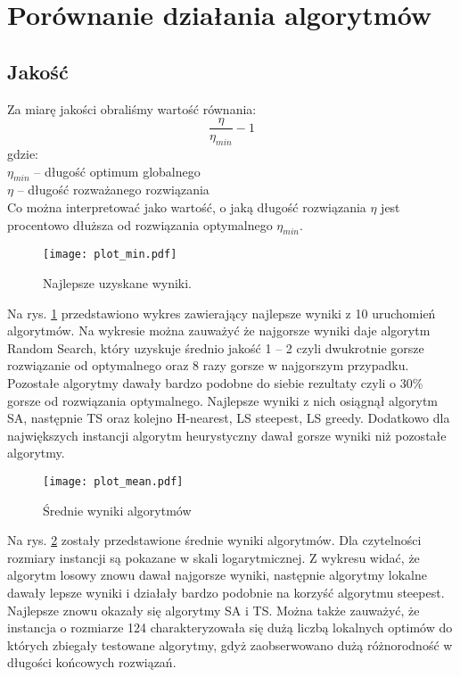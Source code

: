 \documentclass{article}
\begin{document}
\section{Porównanie działania algorytmów}


\subsection{Jakość}
Za miarę jakości obraliśmy wartość równania:
$$ \frac{\eta}{\eta_{min}}-1 $$
gdzie:\\
$\eta_{min}$ -- długość optimum globalnego \\
$\eta$ -- długość rozważanego rozwiązania \\
Co można interpretować jako wartość, o jaką długość rozwiązania $\eta$ jest procentowo dłuższa od rozwiązania optymalnego $\eta_{min}$.

\begin{figure}[H]
\begin{center}
    \texttt{[image: plot\_min.pdf]}
\end{center}
\caption{Najlepsze uzyskane wyniki.}
\label{fig:plot_min}
\end{figure}

Na rys. \ref{fig:plot_min} przedstawiono wykres zawierający najlepsze wyniki z 10 uruchomień algorytmów. Na wykresie można zauważyć że najgorsze wyniki daje algorytm Random Search, który uzyskuje średnio jakość 1 -- 2 czyli dwukrotnie gorsze rozwiązanie od optymalnego oraz 8 razy gorsze w najgorszym przypadku. Pozostałe algorytmy dawały bardzo podobne do siebie rezultaty czyli o 30\% gorsze od rozwiązania optymalnego. Najlepsze wyniki z nich osiągnął algorytm SA, następnie TS oraz kolejno H-nearest, LS steepest, LS greedy. Dodatkowo dla największych instancji algorytm heurystyczny dawał gorsze wyniki niż pozostałe algorytmy.

\begin{figure}[H]
\begin{center}
    \texttt{[image: plot\_mean.pdf]}
\end{center}
\caption{Średnie wyniki algorytmów}
\label{fig:plot_avg}
\end{figure}


Na rys. \ref{fig:plot_avg} zostały przedstawione średnie wyniki algorytmów. Dla czytelności rozmiary instancji są pokazane w skali logarytmicznej. Z wykresu widać, że algorytm losowy znowu dawał najgorsze wyniki, następnie algorytmy lokalne dawały lepsze wyniki i działały bardzo podobnie na korzyść algorytmu steepest. Najlepsze znowu okazały się algorytmy SA i TS. Można także zauważyć, że instancja o rozmiarze 124 charakteryzowała się dużą liczbą lokalnych optimów do których zbiegały testowane algorytmy, gdyż zaobserwowano dużą różnorodność w długości końcowych rozwiązań.
\end{document}
